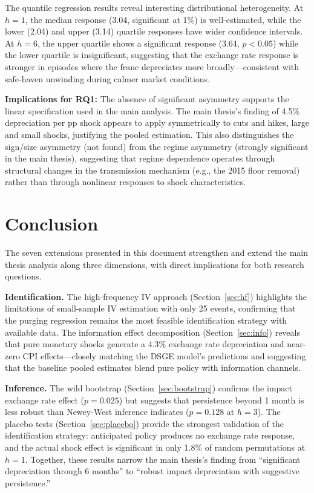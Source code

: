 \documentclass[12pt,a4paper]{article}
\begin{document}
The quantile regression results reveal interesting distributional heterogeneity. At $h=1$, the median response (3.04, significant at 1\%) is well-estimated, while the lower (2.04) and upper (3.14) quartile responses have wider confidence intervals. At $h=6$, the upper quartile shows a significant response (3.64, $p < 0.05$) while the lower quartile is insignificant, suggesting that the exchange rate response is stronger in episodes where the franc depreciates more broadly---consistent with safe-haven unwinding during calmer market conditions.

\textbf{Implications for RQ1:} The absence of significant asymmetry supports the linear specification used in the main analysis. The main thesis's finding of 4.5\% depreciation per pp shock appears to apply symmetrically to cuts and hikes, large and small shocks, justifying the pooled estimation. This also distinguishes the sign/size asymmetry (not found) from the regime asymmetry (strongly significant in the main thesis), suggesting that regime dependence operates through structural changes in the transmission mechanism (e.g., the 2015 floor removal) rather than through nonlinear responses to shock characteristics.


\section{Conclusion}\label{sec:conclusion}

The seven extensions presented in this document strengthen and extend the main thesis analysis along three dimensions, with direct implications for both research questions.

\textbf{Identification.} The high-frequency IV approach (Section~\ref{sec:hf}) highlights the limitations of small-sample IV estimation with only 25 events, confirming that the purging regression remains the most feasible identification strategy with available data. The information effect decomposition (Section~\ref{sec:info}) reveals that pure monetary shocks generate a 4.3\% exchange rate depreciation and near-zero CPI effects---closely matching the DSGE model's predictions and suggesting that the baseline pooled estimates blend pure policy with information channels.

\textbf{Inference.} The wild bootstrap (Section~\ref{sec:bootstrap}) confirms the impact exchange rate effect ($p = 0.025$) but suggests that persistence beyond 1 month is less robust than Newey-West inference indicates ($p = 0.128$ at $h=3$). The placebo tests (Section~\ref{sec:placebo}) provide the strongest validation of the identification strategy: anticipated policy produces no exchange rate response, and the actual shock effect is significant in only 1.8\% of random permutations at $h=1$. Together, these results narrow the main thesis's finding from ``significant depreciation through 6 months'' to ``robust impact depreciation with suggestive persistence.''
\end{document}

